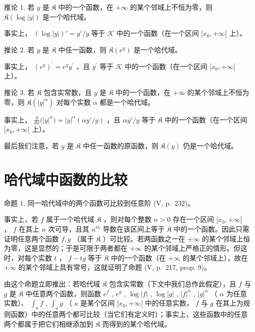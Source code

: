 推论 1. 若 \(y\) 是 \(\mathfrak{K}\) 中的一个函数，在 \(+\infty\) 的某个邻域上不恒为零，则 \(\mathfrak{K}(\log |y|)\) 是一个哈代域。

事实上， \((\log |y|)' = y'/y\) 等于 \(\mathcal{K}\) 中的一个函数（在一个区间 \([x_0, +\infty[\) 上）。

推论 2. 若 \(y\) 是 \(\mathfrak{K}\) 中任一函数，则 \(\mathfrak{K}(e^y)\) 是一个哈代域。

事实上， \(\left(e^{y}\right)^{\prime} = e^{y}y^{\prime}\) ，且 \(y^\prime\) 等于 \(\mathcal{K}\) 中的一个函数（在一个区间 \([x_0, +\infty[\) 上）。

推论 3. 若 \(\mathfrak{K}\) 包含实常数，且 \(y\) 是 \(\mathfrak{K}\) 中的一个函数，在 \(+\infty\) 的某个邻域上不恒为零，则 \(\mathfrak{K}(|y|^{\alpha})\) 对每个实数 \(\alpha\) 都是一个哈代域。

事实上， \(\frac{d}{dx}\big(|y|^{\alpha}\big) = |y|^{\alpha}(\alpha y'/y)\) ，且 \(\alpha y'/y\) 等于 \(\mathfrak{K}\) 中的一个函数（在一个区间 \([x_0, +\infty[\) 上）。

最后我们注意，若 \(y\) 是 \(\mathfrak{K}\) 中任一函数的原函数，则 \(\mathfrak{K}(y)\) 仍是一个哈代域。

\section{哈代域中函数的比较}

命题 1. 同一哈代域中的两个函数可比较到任意阶 (V, p.~232)。

事实上，若 \(f\) 属于一个哈代域 \(\mathfrak{K}\) ，则对每个整数 \(n > 0\) 存在一个区间 \([x_0, +\infty[\) ， \(f\) 在其上 \(n\) 次可导，且其 \(n^{th}\) 导数在该区间上等于 \(\mathfrak{K}\) 中的一个函数。因此只需证明任意两个函数 \(f, g\) （属于 \(\mathfrak{K}\) ）可比较。若两函数之一在 \(+\infty\) 的某个邻域上恒为零，这是显然的；于是可限于两者都在 \(+\infty\) 的某个邻域上严格正的情形。但这时，对每个实数 \(t\) ， \(f - tg\) 等于 \(\mathfrak{K}\) 中的一个函数（在 \(+\infty\) 的某个邻域上），故在 \(+\infty\) 的某个邻域上具有常号，这就证明了命题 (V, p.~217, prop. 9)。

由这个命题立即推出：若哈代域 \(\mathfrak{K}\) 包含实常数（下文中我们总作此假定），且 \(f\) 与 \(g\) 是 \(\mathfrak{K}\) 中任意两个函数，则函数 \(e^f\) , \(e^g\) , \(\log |f|\) , \(\log |g|\) , \(|f|^{\alpha}\) , \(|g|^{\alpha}\) （ \(\alpha\) 为任意实数）、 \(\int_{a} f\) , \(\int_{a} g\) （ \(a\) 是某个区间 \([x_0, +\infty[\) 中的任意实数， \(f\) 与 \(g\) 在其上为规则函数）中的任意两个都可比较（当它们有定义时）；事实上，这些函数中的任意两个都属于把它们相继添加到 \(\mathfrak{K}\) 而得到的某个哈代域。

